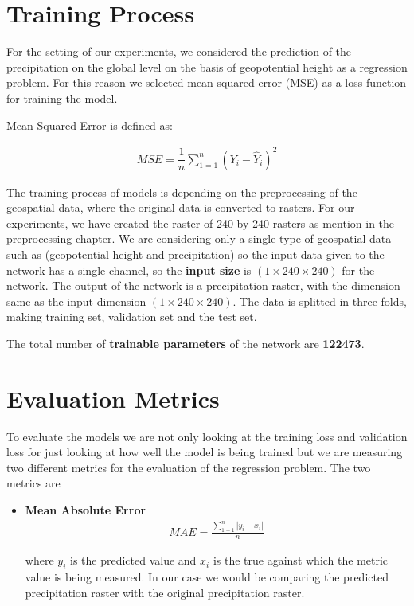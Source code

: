 \newpage

\section{Training Process}

For the setting of our experiments, we considered the prediction of the precipitation on the global level on the basis of geopotential height as a regression problem. For this reason we selected mean squared error (MSE) as a loss function for training the model.

Mean Squared Error is defined as:

\begin{gather*}
    MSE = \dfrac{1}{n}\sum_{1 = 1}^{n}(Y_i-\hat{Y}_i )^2
\end{gather*}

The training process of models is depending on the preprocessing of the geospatial data, where the original data is converted to rasters. For our experiments, we have created the raster of 240 by 240 rasters as mention in the preprocessing chapter.
We are considering only a single type of geospatial data such as (geopotential height and precipitation) so the input data given to the network has a single channel, so the \textbf{input size} is $(1 \times 240  \times 240)$ for the network.
The output of the network is a precipitation raster, with the dimension same as the input dimension $(1 \times 240  \times 240)$. The data is splitted in three folds, making training set, validation set and the test set.

The total number of \textbf{trainable parameters} of the network are \textbf{122473}.
\section{Evaluation Metrics}

To evaluate the models we are not only looking at the training loss and validation loss for just looking at how well the model is being trained but we are measuring two different metrics for the evaluation of the regression problem.
The two metrics are

\begin{itemize}
    \item \textbf{Mean Absolute Error}\\
          \begin{gather*}
              MAE = \frac{\sum_{1 = 1}^{n}\left\lvert
                  y_i - x_i
                  \right\rvert}{n}
          \end{gather*}

          where $y_i$ is the predicted value and $x_i$ is the true against which the metric value is being measured. In our case we would be comparing the predicted precipitation raster with the original precipitation raster.
\end{itemize}